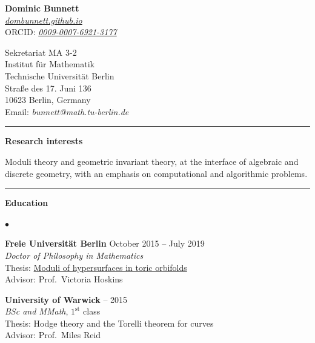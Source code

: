 \documentclass[10pt]{article}
\newcommand{\cvsection}[1]{%
  \par\vspace{0.24cm}%
  \noindent\rule{\textwidth}{0.4pt}%
  \par\vspace{0.12cm}%
  \noindent\textbf{\large #1}%
  \par\vspace{0.12cm}%
}
\newenvironment{cvlist}%
  {\begin{list}{$\bullet$}{%
     \setlength{\leftmargin}{1.1em}\setlength{\labelwidth}{0.8em}%
     \setlength{\itemsep}{0.12cm}\setlength{\parsep}{0pt}%
     \setlength{\topsep}{0pt}\setlength{\partopsep}{0pt}}}%
  {\end{list}}
\begin{document}
\begin{minipage}[t]{0.48\textwidth}
\vspace{0pt}
{\Large\textbf{Dominic Bunnett}}\\[0.30cm]
\href{https://dombunnett.github.io}{\em dombunnett.github.io}\\
ORCID: \href{https://orcid.org/0009-0007-6921-3177}{\em 0009-0007-6921-3177}
\end{minipage}\hfill
\begin{minipage}[t]{0.48\textwidth}
\vspace{0pt}
Sekretariat MA 3-2\\
Institut f\"ur Mathematik\\
Technische Universit\"at Berlin\\
Stra\ss{}e des 17. Juni 136\\
10623 Berlin, Germany\\
Email: {\em bunnett@math.tu-berlin.de}
\end{minipage}

\vspace{0.35cm}

\cvsection{Research interests}
Moduli theory and geometric invariant theory, at the interface of algebraic and
discrete geometry, with an emphasis on computational and algorithmic problems.

\cvsection{Education}
\begin{cvlist}
\item {\bf Freie Universit\"at Berlin} \quad October 2015 -- July 2019\\
{\em Doctor of Philosophy in Mathematics}\\
Thesis: \href{https://refubium.fu-berlin.de/handle/fub188/27333}{Moduli of hypersurfaces in toric orbifolds}\\
Advisor: Prof.\ Victoria Hoskins
\item {\bf University of Warwick}  -- 2015\\
{\em BSc and MMath}, $1^{\text{st}}$ class\\
Thesis: Hodge theory and the Torelli theorem for curves\\
Advisor: Prof.\ Miles Reid
\end{cvlist}
\end{document}
